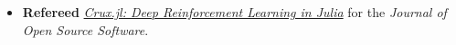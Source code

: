 \documentclass[letterpaper,11pt]{article}
\newcommand{\resitem}[1]{\item #1 \vspace{-2pt}}
\begin{document}
\begin{itemize}
\item
    \textbf{Refereed} \hyperref{https://doi.org/10.21105/joss.09620}{}{}{\textit{Crux.jl: Deep Reinforcement Learning in Julia}} for the \textit{Journal of Open Source Software}. \\

\end{itemize}
\end{document}
